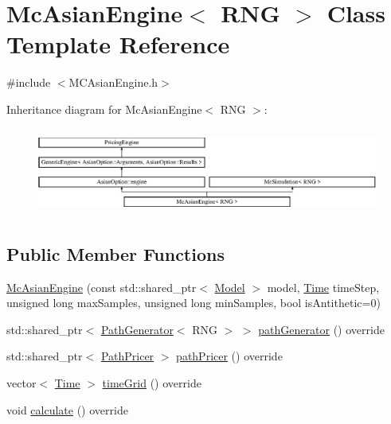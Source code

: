 \hypertarget{class_mc_asian_engine}{}\section{Mc\+Asian\+Engine$<$ R\+NG $>$ Class Template Reference}
\label{class_mc_asian_engine}


{\ttfamily \#include $<$M\+C\+Asian\+Engine.\+h$>$}

Inheritance diagram for Mc\+Asian\+Engine$<$ R\+NG $>$\+:\begin{figure}[H]
\begin{center}
\leavevmode
\includegraphics[height=2.894057cm]{class_mc_asian_engine}
\end{center}
\end{figure}
\subsection*{Public Member Functions}
\begin{DoxyCompactItemize}
\item 
\hyperlink{class_mc_asian_engine_a4b2cd236024fd32623e1f7a7a27277d6}{Mc\+Asian\+Engine} (const std\+::shared\+\_\+ptr$<$ \hyperlink{class_model}{Model} $>$ model, \hyperlink{_name_def_8h_ac2d3e0ba793497bcca555c7c2cf64ff3}{Time} time\+Step, unsigned long max\+Samples, unsigned long min\+Samples, bool is\+Antithetic=0)
\item 
std\+::shared\+\_\+ptr$<$ \hyperlink{class_path_generator}{Path\+Generator}$<$ R\+NG $>$ $>$ \hyperlink{class_mc_asian_engine_ae38592c71ae4d5d09c9eb13d7cc0c5ff}{path\+Generator} () override
\item 
std\+::shared\+\_\+ptr$<$ \hyperlink{class_path_pricer}{Path\+Pricer} $>$ \hyperlink{class_mc_asian_engine_a5b7351c28b68878b7f6d130eef293d6c}{path\+Pricer} () override
\item 
vector$<$ \hyperlink{_name_def_8h_ac2d3e0ba793497bcca555c7c2cf64ff3}{Time} $>$ \hyperlink{class_mc_asian_engine_ad8d2c8721172ab1d7327db91a26c5052}{time\+Grid} () override
\item 
void \hyperlink{class_mc_asian_engine_ac16f4259846f55dc6c02d0b628f34e63}{calculate} () override
\end{DoxyCompactItemize}
